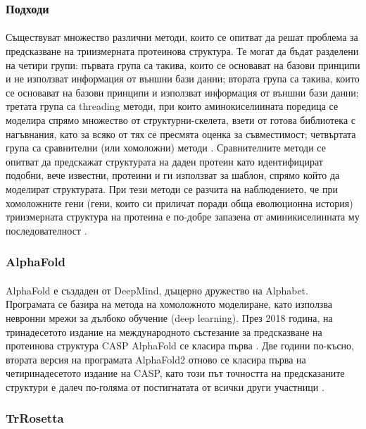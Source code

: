 \documentclass[pdftex,cyrillic,14pt,a4page,twoside,openright]{extreport}
\begin{document}
\subsubsection{Подходи}
\paragraph{}
Съществуват множество различни методи, които се опитват да решат проблема за предсказване на триизмерната протеинова структура. Те могат да бъдат разделени на четири групи: първата група са такива, които се основават на базови принципи и не използват информация от външни бази данни; втората група са такива, които се основават на базови принципи и използват информация от външни бази данни; третата група са threading методи, при които аминокиселиината поредица се моделира спрямо множество от структурни-скелета, взети от готова библиотека с нагъвнания, като за всяко от тях се пресмята оценка за съвместимост; четвъртата група са сравнителни (или хомоложни) методи \cite{dorn2014}. Сравнителните методи се опитват да предскажат структурата на даден протеин като идентифицират подобни, вече известни, протеини и ги използват за шаблон, спрямо който да моделират структурата. При тези методи се разчита на наблюдението, че при хомоложните гени (гени, които си приличат поради обща еволюционна история) триизмерната структура на протеина е по-добре запазена от аминикиселинната му последователност \cite{illergard2009}.


\subsubsection{AlphaFold}\label{sec:alphafold}
\paragraph{}
AlphaFold е създаден от DeepMind, дъщерно дружество на Alphabet. Програмата се базира на метода на хомоложното моделиране, като използва невронни мрежи за дълбоко обучение (deep learning). През 2018 година, на тринадесетото издание на международното състезание за предсказване на протеинова структура CASP AlphaFold се класира първа \cite{alquraishi2019}. Две години по-късно, втората версия на програмата AlphaFold2 отново се класира първа на четиринадесетото издание на CASP, като този път точността на предсказаните структури е далеч по-голяма от постигнатата от всички други участници \cite{alphafold2021}.

\subsubsection{TrRosetta}
\end{document}
